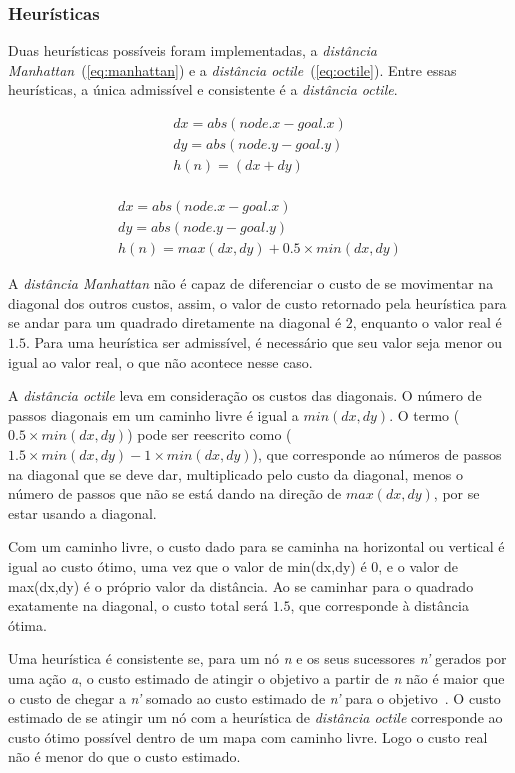 \subsubsection{Heurísticas}
Duas heurísticas possíveis foram implementadas, a \textit{distância Manhattan}~(\ref{eq:manhattan}) e a \textit{distância octile}~(\ref{eq:octile}). Entre essas heurísticas, a única admissível e consistente é a \textit{distância octile}.

\begin{equation}\label{eq:manhattan}
\begin{matrix}
dx = abs(node.x - goal.x)\\
dy = abs(node.y - goal.y)\\
h(n) = (dx + dy)\\
\end{matrix}
\end{equation}

\begin{equation}\label{eq:octile}
\begin{matrix}
dx = abs(node.x - goal.x)\\
dy = abs(node.y - goal.y)\\
h(n) = max(dx,dy) + 0.5 \times min(dx,dy)
\end{matrix}
\end{equation}

A \textit{distância Manhattan} não é capaz de diferenciar o custo de se movimentar na diagonal dos outros custos, assim, o valor de custo retornado pela heurística para se andar para um quadrado diretamente na diagonal é $2$, enquanto o valor real é $1.5$. Para uma heurística ser admissível, é necessário que seu valor seja menor ou igual ao valor real, o que não acontece nesse caso.

A \textit{distância octile} leva em consideração os custos das diagonais. O número de passos diagonais em um caminho livre é igual a $min(dx,dy)$. O termo ($0.5\times min(dx,dy)$) pode ser reescrito como ($1.5 \times min(dx,dy) - 1 \times min(dx,dy)$), que corresponde ao números de passos na diagonal que se deve dar, multiplicado pelo custo da diagonal, menos o número de passos que não se está dando na direção de $max(dx,dy)$, por se estar usando a diagonal.

Com um caminho livre, o custo dado para se caminha na horizontal ou vertical é igual ao custo ótimo, uma vez que o valor de min(dx,dy) é 0, e o valor de max(dx,dy) é o próprio valor da distância. Ao se caminhar para o quadrado exatamente na diagonal, o custo total será $1.5$, que corresponde à distância ótima.

Uma heurística é consistente se, para um nó \textit{n} e os seus sucessores \textit{n'} gerados por uma ação \textit{a}, o custo estimado de atingir o objetivo a partir de \textit{n} não é maior que o custo de chegar a \textit{n'} somado ao custo estimado de \textit{n'} para o objetivo~\cite{russell2010artificial}. O custo estimado de se atingir um nó com a heurística de \textit{distância octile} corresponde ao custo ótimo possível dentro de um mapa com caminho livre. Logo o custo real não é menor do que o custo estimado.
